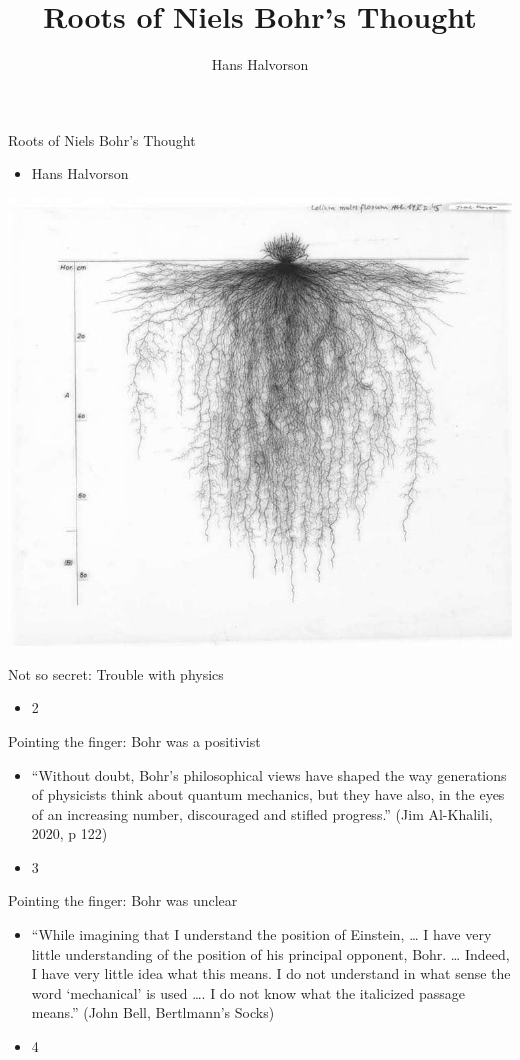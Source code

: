 \documentclass{beamer}
\title{Roots of Niels Bohr’s Thought}
\author{Hans Halvorson}
\date{}
\begin{document}
\frame{\titlepage}
\begin{frame}{Roots of Niels Bohr’s Thought}
\begin{itemize}
  \item Hans Halvorson
\end{itemize}
\includegraphics[width=0.9\linewidth]{slide1_img1.jpg}
\end{frame}
\begin{frame}{Not so secret: Trouble with physics}
\begin{itemize}
  \item 2
\end{itemize}
\end{frame}
\begin{frame}{Pointing the finger: Bohr was a positivist}
\begin{itemize}
  \item “Without doubt, Bohr’s philosophical views have shaped the way generations of physicists think about quantum mechanics, but they have also, in the eyes of an increasing number, discouraged and stifled progress.” (Jim Al-Khalili, 2020, p 122)
  \item 3
\end{itemize}
\end{frame}
\begin{frame}{Pointing the finger: Bohr was unclear}
\begin{itemize}
  \item “While imagining that I understand the position of Einstein, … I have very little understanding of the position of his principal opponent, Bohr.
… Indeed, I have very little idea what this means. I do not understand in what sense the word ‘mechanical’ is used …. I do not know what the italicized passage means.” (John Bell, Bertlmann’s Socks)
  \item 4
\end{itemize}
\end{frame}
\end{document}
